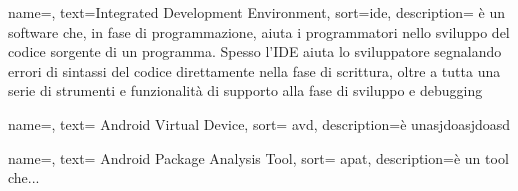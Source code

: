 
{
name=,
text=Integrated Development Environment,
sort=ide,
description={ è un software che, in fase di programmazione, aiuta i programmatori nello sviluppo del codice sorgente di un programma.
Spesso l’IDE aiuta lo sviluppatore segnalando errori di sintassi del codice direttamente nella fase di scrittura, oltre a tutta una serie di strumenti e funzionalità di supporto alla fase di sviluppo e debugging}
}


{
name=,
text= Android Virtual Device,
sort= avd,
description={è unasjdoasjdoasd}
}


{
name=,
text= Android Package Analysis Tool,
sort= apat,
description={è un tool che...}
}




